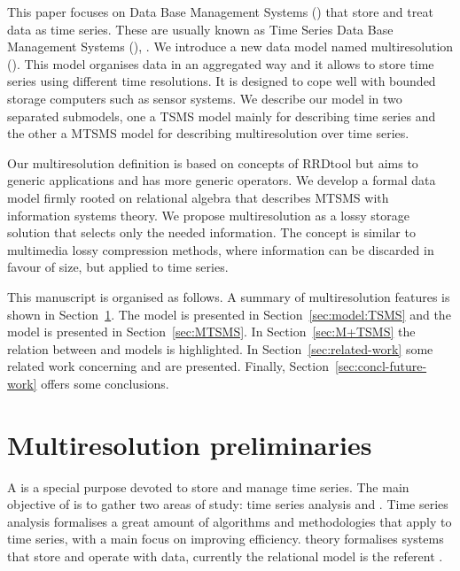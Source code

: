 
This paper focuses on Data Base Management Systems \linebreak[4]
() that store and treat data as time series. These are
usually known as Time Series Data Base Management Systems
(), \cite{dreyer94,last01}.  We introduce a new data model
named multiresolution  (). This model organises
data in an aggregated way and it allows to store time series using
different time resolutions. It is designed to cope well with bounded
storage computers such as sensor systems.  We describe our model in
two separated submodels, one a TSMS model mainly for describing time
series and the other a MTSMS model for describing multiresolution over
time series.


Our multiresolution definition is based on concepts of RRDtool but
aims to generic applications and has more generic operators. We
develop a formal data model firmly rooted on relational algebra that
describes MTSMS with information systems theory.  We propose
multiresolution as a lossy storage solution that selects only the
needed information. The concept is similar to multimedia lossy
compression methods, where information can be discarded in favour of
size, but applied to time series.




This manuscript is organised as follows.  A summary of multiresolution
features is shown in Section~\ref{sec:features}.  The 
model is presented in Section~\ref{sec:model:TSMS} and the
 model is presented in Section~\ref{sec:MTSMS}. In
Section~\ref{sec:M+TSMS} the relation between  and
 models is highlighted.
In Section~\ref{sec:related-work} some related work concerning
 and  are presented. Finally,
Section~\ref{sec:concl-future-work} offers some conclusions.


\section{Multiresolution preliminaries}
\label{sec:features}

A  is a special purpose  devoted to store and
manage time series.  The main objective of  is to gather
two areas of study: time series analysis and .  Time series
analysis formalises a great amount of algorithms and methodologies
that apply to time series, with a main focus on improving
efficiency.  theory formalises systems that store and
operate with data, currently the relational model is the referent
\cite{date:introduction}.





